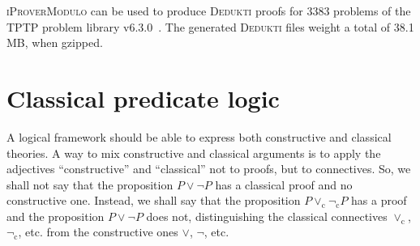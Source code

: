 \documentclass[english]{lipics}
\begin{document}



\textsc{iProverModulo} can be used to produce \textsc{Dedukti} proofs
for 3383 problems of the TPTP problem library v6.3.0~\cite{SS98}. The
generated \textsc{Dedukti} files weight a total of 38.1 MB, when
gzipped.

\section{Classical predicate logic}
\label{sec:classical}

A logical framework should be able to express both constructive and
classical theories. A way to mix constructive and classical arguments
is to apply the adjectives ``constructive'' and ``classical'' not to
proofs, but to connectives. So, we shall not say that the proposition
$P \vee \neg P$ has a classical proof and no constructive one. Instead,
we shall say that the proposition $P \vee_{\mathrm c} \neg_{\mathrm c} P$ has a proof and
the proposition $P \vee \neg P$ does not, distinguishing the classical
connectives $\vee_{\mathrm c}$, $\neg_{\mathrm c}$, etc. from the constructive ones
$\vee$, $\neg$, etc.
\end{document}
